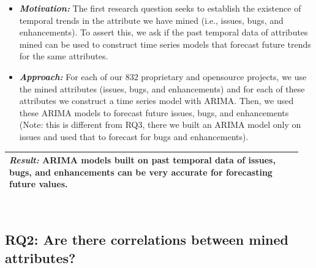 \documentclass[sigconf, preprint]{acmart}
\begin{document}
\begin{itemize}[leftmargin=-1pt]
	
	\item[] \textit{\textbf{Motivation:}} The first research question seeks to establish the existence of temporal trends in the attribute we have mined (i.e., issues, bugs, and enhancements). To assert this, we ask if the past temporal data of attributes mined can be used to construct time series models that forecast future trends for the same attributes.
	
	\item[] \textit{\textbf{Approach:}} For each of our 832 proprietary and 
	opensource 
	projects, we use the mined attributes (issues, bugs, and enhancements) and for each of these attributes we 
	construct a time series model with ARIMA. Then, we used these ARIMA models 
	to forecast future issues, bugs, and enhancements (Note: this is different from RQ3, there we 
	built an ARIMA model only on issues and used that to forecast for bugs and 
	enhancements).\\[-.2cm]
	
\end{itemize}

\noindent\begin{minipage}{\linewidth}
	\begin{center}
		\begin{tabular}{p{0.95\linewidth}}
			\arrayrulecolor{Gray}
			\hline
			 
			\rowcolor{Gray} \textit{\textbf{Result:}} ARIMA models built on past 
	temporal data of issues, bugs, and enhancements can be very accurate for 
	forecasting future values.\\\hline
		\end{tabular}
	\end{center}
\end{minipage}\bigstrut[t]\\[-.2cm]


\subsection*{\bf{RQ2: Are there correlations between mined attributes?}}
\end{document}

